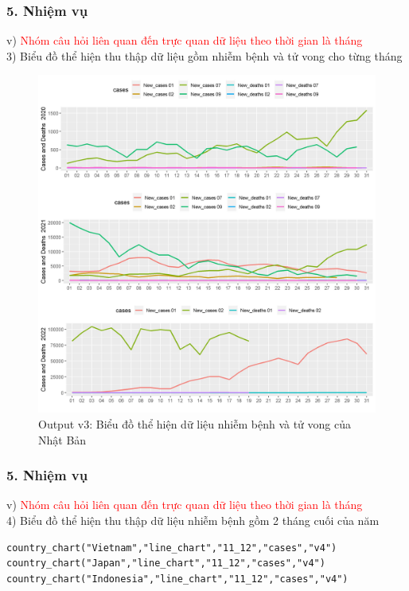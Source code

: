 \documentclass[english,10pt,table]{beamer}
\begin{document}
\begin{frame}[fragile]
\frametitle{5.  Nhiệm vụ}
v) \textcolor{red}{Nhóm câu hỏi liên quan đến trực quan dữ liệu theo thời gian là tháng}\\
    3) Biểu đồ thể hiện thu thập dữ liệu gồm nhiễm bệnh và tử vong cho từng tháng
	\begin{figure}[h!]
	\begin{center}
		    \includegraphics[scale = 0.25]{Images/V/v3 Japan .jpeg}
		     \caption{Output v3: Biểu đồ thể hiện dữ liệu nhiễm bệnh và tử vong của Nhật Bản}
		\end{center}
		\end{figure}
\end{frame}

\begin{frame}[fragile]
\frametitle{5.  Nhiệm vụ}
v) \textcolor{red}{Nhóm câu hỏi liên quan đến trực quan dữ liệu theo thời gian là tháng}\\
    4) Biểu đồ thể hiện thu thập dữ liệu nhiễm bệnh gồm 2 tháng cuối của năm
    \begin{lstlisting}[frame=single,basicstyle=\tiny]  
country_chart("Vietnam","line_chart","11_12","cases","v4")
country_chart("Japan","line_chart","11_12","cases","v4")
country_chart("Indonesia","line_chart","11_12","cases","v4")
		\end{lstlisting}
\end{frame}
\end{document}
